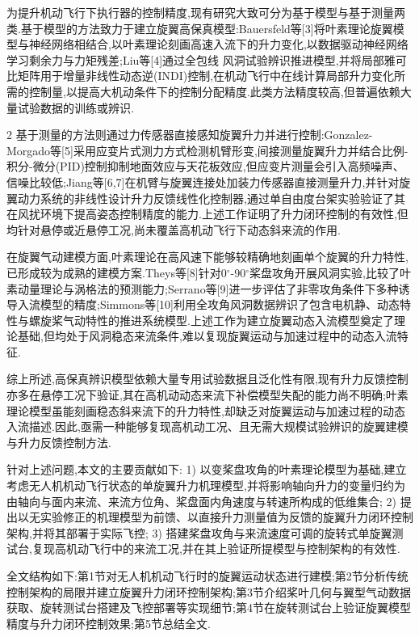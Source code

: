 \documentclass{aas}
\begin{document}
为提升机动飞行下执行器的控制精度,现有研究大致可分为基于模型与基于测量两类.基于模型的方法致力于建立旋翼高保真模型:Bauersfeld等[3]将叶素理论旋翼模型与神经网络相结合,以叶素理论刻画高速入流下的升力变化,以数据驱动神经网络学习剩余力与力矩残差;Liu等[4]通过全包线
风洞试验辨识推进模型,并将局部雅可比矩阵用于增量非线性动态逆(INDI)控制,在机动飞行中在线计算局部升力变化所需的控制量,以提高大机动条件下的控制分配精度.此类方法精度较高,但普遍依赖大量试验数据的训练或辨识.
\onecolumn\begin{multicols}{2}%
基于测量的方法则通过力传感器直接感知旋翼升力并进行控制:Gonzalez-Morgado等[5]采用应变片式测力方式检测机臂形变,间接测量旋翼升力并结合比例-积分-微分(PID)控制抑制地面效应与天花板效应,但应变片测量会引入高频噪声、信噪比较低;Jiang等[6,7]在机臂与旋翼连接处加装力传感器直接测量升力,并针对旋翼动力系统的非线性设计升力反馈线性化控制器,通过单自由度台架实验验证了其在风扰环境下提高姿态控制精度的能力.上述工作证明了升力闭环控制的有效性,但均针对悬停或近悬停工况,尚未覆盖高机动飞行下动态斜来流的作用.

在旋翼气动建模方面,叶素理论在高风速下能够较精确地刻画单个旋翼的升力特性,已形成较为成熟的建模方案.Theys等[8]针对0$^{\circ}$-90$^{\circ}$桨盘攻角开展风洞实验,比较了叶素动量理论与涡格法的预测能力;Serrano等[9]进一步评估了非零攻角条件下多种诱导入流模型的精度;Simmons等[10]利用全攻角风洞数据辨识了包含电机静、动态特性与螺旋桨气动特性的推进系统模型.上述工作为建立旋翼动态入流模型奠定了理论基础,但均处于风洞稳态来流条件,难以复现旋翼运动与加速过程中的动态入流特征.

综上所述,高保真辨识模型依赖大量专用试验数据且泛化性有限,现有升力反馈控制亦多在悬停工况下验证,其在高机动动态来流下补偿模型失配的能力尚不明确;叶素理论模型虽能刻画稳态斜来流下的升力特性,却缺乏对旋翼运动与加速过程的动态入流描述.因此,亟需一种能够复现高机动工况、且无需大规模试验辨识的旋翼建模与升力反馈控制方法.

针对上述问题,本文的主要贡献如下:
1) 以变桨盘攻角的叶素理论模型为基础,建立考虑无人机机动飞行状态的单旋翼升力机理模型,并将影响轴向升力的变量归约为由轴向与面内来流、来流方位角、桨盘面内角速度与转速所构成的低维集合;
2) 提出以无实验修正的机理模型为前馈、以直接升力测量值为反馈的旋翼升力闭环控制架构,并将其部署于实际飞控;
3) 搭建桨盘攻角与来流速度可调的旋转式单旋翼测试台,复现高机动飞行中的来流工况,并在其上验证所提模型与控制架构的有效性.

全文结构如下:第1节对无人机机动飞行时的旋翼运动状态进行建模;第2节分析传统控制架构的局限并建立旋翼升力闭环控制架构;第3节介绍桨叶几何与翼型气动数据获取、旋转测试台搭建及飞控部署等实现细节;第4节在旋转测试台上验证旋翼模型精度与升力闭环控制效果;第5节总结全文.

\end{multicols}
\end{document}
